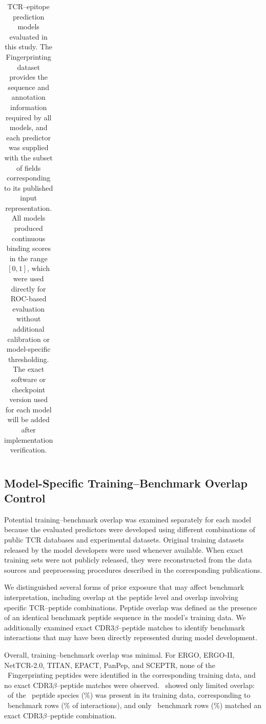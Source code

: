 \documentclass{article}
\begin{document}
\begin{table}[h]
\begin{tabularx}{\textwidth}{l X X X X l}
\hline
\end{tabularx}

\caption{
TCR--epitope prediction models evaluated in this study. The
Fingerprinting dataset provides the sequence and annotation information
required by all models, and each predictor was supplied with the subset of
fields corresponding to its published input representation. All models
produced continuous binding scores in the range $[0,1]$, which were used
directly for ROC-based evaluation without additional calibration or
model-specific thresholding. The exact software or checkpoint version used
for each model will be added after implementation verification.
}
\label{tab:models}
\end{table}

\subsection{Model-Specific Training--Benchmark Overlap Control}

Potential training--benchmark overlap was examined separately for each model
because the evaluated predictors were developed using different combinations
of public TCR databases and experimental datasets. Original training datasets
released by the model developers were used whenever available. When exact
training sets were not publicly released, they were reconstructed from the
data sources and preprocessing procedures described in the corresponding
publications.

We distinguished several forms of prior exposure that may affect benchmark
interpretation, including overlap at the peptide level and overlap involving
specific TCR--peptide combinations. Peptide overlap was defined as the
presence of an identical benchmark peptide sequence in the model's training
data. We additionally examined exact CDR3$\beta$--peptide matches to identify
benchmark interactions that may have been directly represented during model
development.

Overall, training--benchmark overlap was minimal. For ERGO, ERGO-II,
NetTCR-2.0, TITAN, EPACT, PanPep, and SCEPTR, none of the \valNpeptides\ Fingerprinting
peptides were identified in the corresponding training data, and no exact
CDR3$\beta$--peptide matches were observed. \valOverlapModel\ showed only limited
overlap: \valOverlapPeptidesWord\ of the \valNpeptides\ peptide species (\valOvlPepPctNetTCRtwotwo\%) was present in its training
data, corresponding to \valOvlPepRowsNetTCRtwotwo\ benchmark rows (\valOvlPepRowPctNetTCRtwotwo\% of interactions), and only
\valOverlapPairRowsWord\ benchmark rows (\valOvlPairPctNetTCRtwotwo\%) matched an exact CDR3$\beta$--peptide combination.
\end{document}
